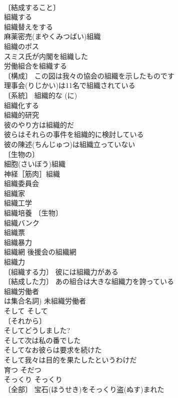 \documentclass[8pt]{extreport}
\begin{document}
\begin{CJK}{UTF8}{min}
\\	〔結成すること〕
\\	組織する 
\\	組織替えをする 
\\	麻薬密売(まやくみつばい)組織 
\\	組織のボス 
\\	スミス氏が内閣を組織した 
\\	労働組合を組織する 
\\	〔構成〕 この図は我々の協会の組織を示したものです 
\\	理事会(りじかい)は11名で組織されている 
\\	〔系統〕 組織的な (に) 
\\	組織化する 
\\	組織的研究 
\\	彼のやり方は組織的だ 
\\	彼らはそれらの事件を組織的に検討している 
\\	彼の陳述(ちんじゅつ)は組織立っていない 
\\	〔生物の〕
\\	細胞(さいぼう)組織 
\\	神経［筋肉］組織 
\\	組織委員会 
\\	組織家 
\\	組織工学 
\\	組織培養 〔生物〕
\\	組織バンク 
\\	組織票 
\\	組織暴力 
\\	組織網 後援会の組織網 
\\	組織力 
\\	〔組織する力〕 彼には組織力がある 
\\	〔結成した力〕 あの組合は大きな組織力を誇っている 
\\	組織労働者 
\\	は集合名詞) 未組織労働者 
\\	そして	そして	
\\	〔それから〕
\\	そしてどうしました? 
\\	そして次は私の番でした 
\\	そしてなお彼らは要求を続けた 
\\	そして我々は目的を果たしたというわけだ 
\\	育つ	そだつ	
\\	そっくり	そっくり	
\\	〔全部〕 宝石(ほうせき)をそっくり盗(ぬす)まれた 

\end{CJK}
\end{document}
